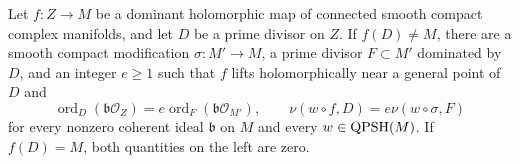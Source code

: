 \begin{lemma}\label{lem:dominant-divisorial-extraction}
Let $f\colon Z\to M$ be a dominant holomorphic map of connected smooth compact complex manifolds, and let $D$ be a prime divisor on $Z$. If $f(D)\ne M$, there are a smooth compact modification $\sigma\colon M'\to M$, a prime divisor $F\subset M'$ dominated by $D$, and an integer $e\geq1$ such that $f$ lifts holomorphically near a general point of $D$ and
\begin{equation}\label{eq:dominant-divisorial-pullback}
 \operatorname{ord}_D(\mathfrak b\mathcal O_Z)
   =e\operatorname{ord}_F(\mathfrak b\mathcal O_{M'}),
 \qquad
 \nu(w\circ f,D)=e\nu(w\circ\sigma,F)
\end{equation}
for every nonzero coherent ideal $\mathfrak b$ on $M$ and every $w\in\mathrm{QPSH}(M)$. If $f(D)=M$, both quantities on the left are zero.
\end{lemma}
